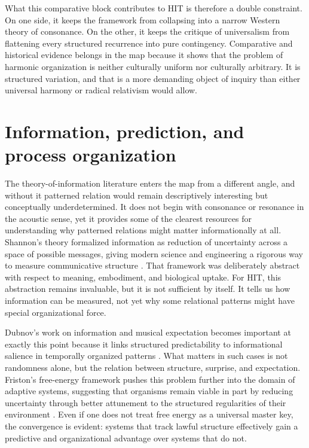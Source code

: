 What this comparative block contributes to HIT is therefore a double constraint. On one side, it keeps the framework from collapsing into a narrow Western theory of consonance. On the other, it keeps the critique of universalism from flattening every structured recurrence into pure contingency. Comparative and historical evidence belongs in the map because it shows that the problem of harmonic organization is neither culturally uniform nor culturally arbitrary. It is structured variation, and that is a more demanding object of inquiry than either universal harmony or radical relativism would allow.

\section{Information, prediction, and process organization}

The theory-of-information literature enters the map from a different angle, and without it patterned relation would remain descriptively interesting but conceptually underdetermined. It does not begin with consonance or resonance in the acoustic sense, yet it provides some of the clearest resources for understanding why patterned relations might matter informationally at all. Shannon's theory formalized information as reduction of uncertainty across a space of possible messages, giving modern science and engineering a rigorous way to measure communicative structure \parencite{shannon_1948}. That framework was deliberately abstract with respect to meaning, embodiment, and biological uptake. For HIT, this abstraction remains invaluable, but it is not sufficient by itself. It tells us how information can be measured, not yet why some relational patterns might have special organizational force.

Dubnov's work on information and musical expectation becomes important at exactly this point because it links structured predictability to informational salience in temporally organized patterns \parencite{dubnov_2004}. What matters in such cases is not randomness alone, but the relation between structure, surprise, and expectation. Friston's free-energy framework pushes this problem further into the domain of adaptive systems, suggesting that organisms remain viable in part by reducing uncertainty through better attunement to the structured regularities of their environment \parencite{friston_2010}. Even if one does not treat free energy as a universal master key, the convergence is evident: systems that track lawful structure effectively gain a predictive and organizational advantage over systems that do not.

